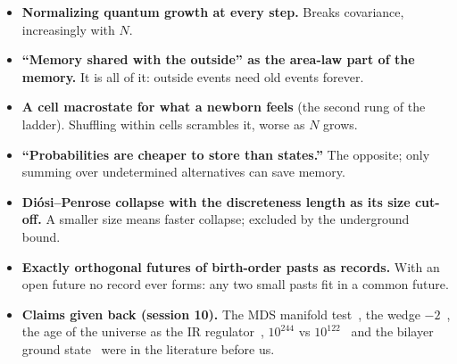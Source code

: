 \documentclass[11pt,a4paper]{article}
\begin{document}
\begin{itemize}[leftmargin=*,itemsep=1pt]
\item \textbf{Normalizing quantum growth at every step.} Breaks covariance, increasingly with $N$.
\item \textbf{``Memory shared with the outside'' as the area-law part of the memory.} It is all of it: outside events need old events forever.
\item \textbf{A cell macrostate for what a newborn feels} (the second rung of the ladder). Shuffling within cells scrambles it, worse as $N$ grows.
\item \textbf{``Probabilities are cheaper to store than states.''} The opposite; only summing over undetermined alternatives can save memory.
\item \textbf{Di\'osi--Penrose collapse with the discreteness length as its size cut-off.} A smaller size means faster collapse; excluded by the underground bound.
\item \textbf{Exactly orthogonal futures of birth-order pasts as records.} With an open future no record ever forms: any two small pasts fit in a common future.
\item \textbf{Claims given back (session 10).} The MDS manifold test~\cite{CloughEvans16}, the wedge $-2$~\cite{BK25}, the age of the universe as the IR regulator~\cite{Sorkin07}, $10^{244}$ vs $10^{122}$~\cite{Sorkin07L} and the bilayer ground state~\cite{CunninghamSurya19} were in the literature before us.
\end{itemize}
\end{document}
